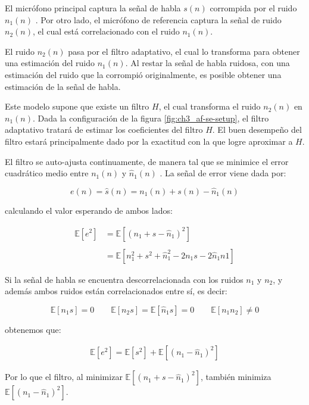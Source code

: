 El micrófono principal captura la señal de habla $s(n)$ corrompida por el ruido $n_1(n)$ . Por otro lado, el micrófono de referencia captura la señal de ruido $n_2(n)$, el cual está correlacionado con el ruido $n_1(n)$. 

El ruido $n_2(n)$ pasa por el filtro adaptativo, el cual lo transforma para obtener una estimación del ruido $n_1(n)$. Al restar la señal de habla ruidosa, con una estimación del ruido que la corrompió originalmente, es posible obtener una estimación de la señal de habla. 

Este modelo supone que existe un filtro $H$, el cual transforma el ruido $n_2(n)$ en $n_1(n)$. Dada la configuración de la figura \ref{fig:ch3_af-se-setup}, el filtro adaptativo tratará de estimar los coeficientes del filtro $H$. El buen desempeño del filtro estará principalmente dado por la exactitud con la que logre aproximar a $H$.

El filtro se auto-ajusta continuamente, de manera tal que se minimice el error cuadrático medio entre $n_1(n)$ y $\hat{n}_1(n)$ . La señal de error viene dada por:

\begin{equation*}
	e(n) = \hat{s}(n) = n_1(n) + s(n) - \hat{n}_1(n)
\end{equation*}

\noindent calculando el valor esperando de ambos lados:

\begin{align*}
	\mathbb{E}[e^2] &= \mathbb{E}[( n_1 + s - \hat{n}_1)^2] \\ \\
	&= \mathbb{E}[n_1^2 + s^2 + \hat{n}_1^2 - 2 n_1 s - 2 \hat{n}_1 n1]
\end{align*}

Si la señal de habla se encuentra descorrelacionada con los ruidos $n_1$ y $n_2$, y además ambos ruidos están correlacionados entre sí, es decir:

\begin{equation*}
	\mathbb{E}[n_1 s] = 0 \qquad \mathbb{E}[n_2 s] = \mathbb{E}[\hat{n}_1 s] = 0 \qquad \mathbb{E}[n_1 n_2] \neq 0
\end{equation*}

\noindent obtenemos que:

\begin{align*}
	\mathbb{E}[e^2] = \mathbb{E}[s^2] + \mathbb{E}[(n_1 - \hat{n}_1)^2]
\end{align*}

Por lo que el filtro, al minimizar $\mathbb{E}[( n_1 + s - \hat{n}_1)^2]$, también minimiza $\mathbb{E}[(n_1 - \hat{n}_1)^2]$.


